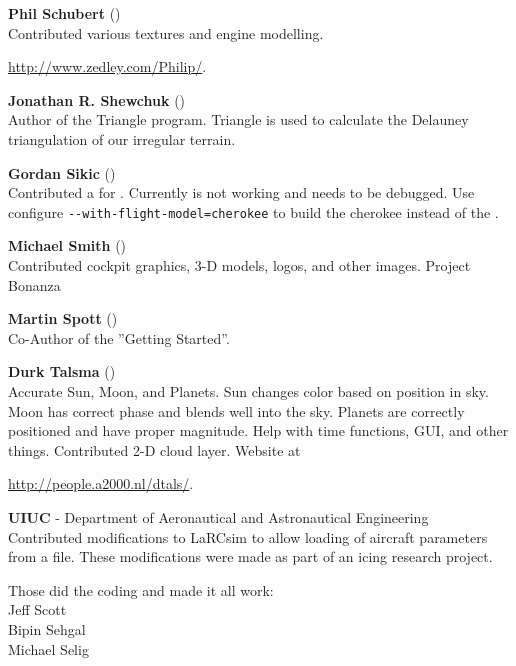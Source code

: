 \noindent \textbf{Phil Schubert} ()\\
  Contributed various textures and engine modelling.
   \medskip

  \href{http://www.zedley.com/Philip/}{http://www.zedley.com/Philip/}.
  \medskip

 \noindent \textbf{Jonathan R. Shewchuk}
()\\
  Author of the Triangle program.  Triangle
  is used to calculate the  Delauney triangulation of our irregular terrain.
 \medskip

\noindent \textbf{Gordan Sikic} ()\\
  Contributed a  for .  Currently is not
  working and needs to be debugged.  Use configure
  \texttt{-$ $-with-flight-model=cherokee}
  to build the cherokee instead of the .
 \medskip

\noindent \textbf{Michael Smith} ()\\
  Contributed cockpit graphics, 3-D models, logos, and other images.
  Project Bonanza
   \medskip

\noindent \textbf{Martin Spott} ()\\
  Co-Author of the ''Getting Started''.
  \medskip

\noindent \textbf{Durk Talsma} ()\\
  Accurate Sun, Moon, and Planets.  Sun changes color based on
  position in sky. Moon has correct phase and blends well into the
  sky.  Planets are correctly positioned and have proper magnitude. Help with time
  functions, GUI, and other things. Contributed 2-D cloud layer. Website
  at
   \medskip

 \href{http://people.a2000.nl/dtals/}{http://people.a2000.nl/dtals/}.
 \medskip

\noindent \textbf{UIUC} - Department of Aeronautical and Astronautical
Engineering\\
  Contributed modifications to LaRCsim to allow loading of aircraft
  parameters from a file.  These modifications were made as part of an
  icing research project.
  \medskip

  Those did the coding and made it all work:\\
      Jeff Scott \\
      Bipin Sehgal \\
      Michael Selig 
  \medskip

